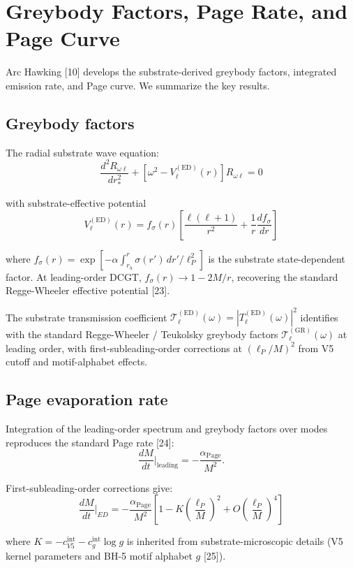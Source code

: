 \documentclass[11pt,a4paper]{article}
\begin{document}
\section{Greybody Factors, Page Rate, and Page Curve}

Arc Hawking [10] develops the substrate-derived greybody factors, integrated emission rate, and Page curve. We summarize the key results.

\subsection{Greybody factors}

The radial substrate wave equation:
\[
\frac{d^2 R_{\omega\ell}}{dr_*^2} + [\omega^2 - V_\ell^{(\mathrm{ED})}(r)] R_{\omega\ell} = 0
\]

with substrate-effective potential
\[
V_\ell^{(\mathrm{ED})}(r) = f_\sigma(r) \left[\frac{\ell(\ell+1)}{r^2} + \frac{1}{r}\frac{df_\sigma}{dr}\right]
\]

where $f_\sigma(r) = \exp[-\alpha \int_{r_h}^r \sigma(r')\, dr'/\ell_P^2]$ is the substrate state-dependent factor. At leading-order DCGT, $f_\sigma(r) \to 1 - 2M/r$, recovering the standard Regge-Wheeler effective potential [23].

The substrate transmission coefficient $\mathcal{T}_\ell^{(\mathrm{ED})}(\omega) = |T_\ell^{(\mathrm{ED})}(\omega)|^2$ identifies with the standard Regge-Wheeler / Teukolsky greybody factors $\mathcal{T}_\ell^{(\mathrm{GR})}(\omega)$ at leading order, with first-subleading-order corrections at $(\ell_P/M)^2$ from V5 cutoff and motif-alphabet effects.

\subsection{Page evaporation rate}

Integration of the leading-order spectrum and greybody factors over modes reproduces the standard Page rate [24]:
\[
\frac{dM}{dt}\bigg|_{\mathrm{leading}} = -\frac{\alpha_{\mathrm{Page}}}{M^2}.
\]

First-subleading-order corrections give:
\[
\frac{dM}{dt}\bigg|_{ED} = -\frac{\alpha_{\mathrm{Page}}}{M^2} \left[1 - K\left(\frac{\ell_P}{M}\right)^2 + O\left(\frac{\ell_P}{M}\right)^4\right]
\]

where $K = -c_{V5}^{\mathrm{int}} - c_g^{\mathrm{int}} \log g$ is inherited from substrate-microscopic details (V5 kernel parameters and BH-5 motif alphabet $g$ [25]).
\end{document}
